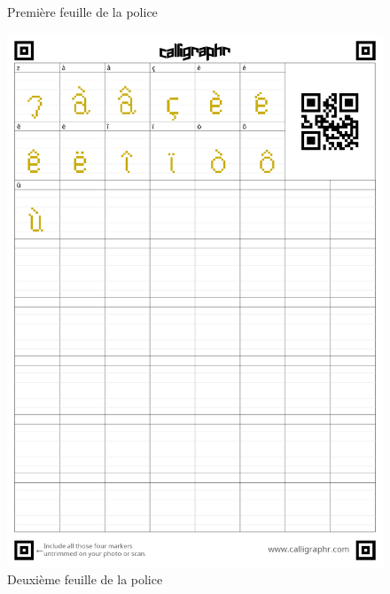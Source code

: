 \documentclass[11pt]{article}
\begin{document}
\begin{appendices}
\begin{figure}[H]
\caption{Première feuille de la police}
\end{figure}
\begin{figure}[H]
\includegraphics[scale=0.2]{fontPage2}
\caption{Deuxième feuille de la police}
\end{figure}
\begin{figure}[H]

\end{figure}
\end{appendices}
\end{document}

